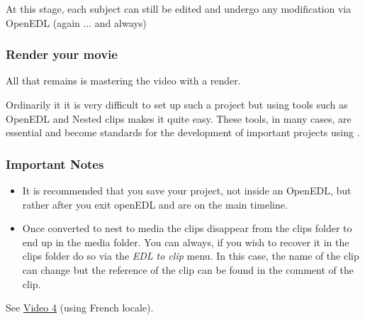 At this stage, each subject can still be edited and undergo any modification via OpenEDL (again ... and always)

\subsubsection*{Render your movie}
\label{ssub:render_movie}

All that remains is mastering the video with a render.

Ordinarily it it is very difficult to set up such a project but using tools such as OpenEDL and Nested clips makes it quite easy. These tools, in many cases, are essential and become standards for the development of important projects using \CGG{}.

\subsubsection*{Important Notes}
\label{ssub:important_notes}

\begin{itemize}
	\item It is recommended that you save your project, not inside an OpenEDL, but rather after you exit openEDL and are on the main timeline.
	\item Once converted to nest to media the clips disappear from the clips folder to end up in the media folder. You can always, if you wish to recover it in the clips folder do so via the \textit{EDL to clip} menu. In this case, the name of the clip can change but the reference of the clip can be found in the comment of the clip.
\end{itemize}

See \href{https://youtu.be/bfYaBqVbdCo}{Video 4} (using French locale).

